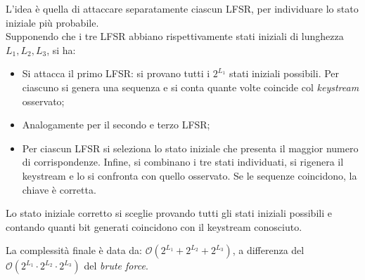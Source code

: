 \noindent L'idea è quella di attaccare separatamente ciascun LFSR, per individuare lo stato iniziale più probabile. \\ Supponendo che i tre LFSR abbiano rispettivamente stati iniziali di lunghezza $L_1, L_2, L_3$, si ha:
\begin{itemize}
    \item Si attacca il primo LFSR: si provano tutti i $2^{L_1}$ stati iniziali possibili. Per ciascuno si genera una sequenza e si conta quante volte coincide col \textit{keystream} osservato;
    \item Analogamente per il secondo e terzo LFSR;
    \item Per ciascun LFSR si seleziona lo stato iniziale che presenta il maggior numero di corrispondenze. Infine, si combinano i tre stati individuati, si rigenera il keystream e lo si confronta con quello osservato. Se le sequenze coincidono, la chiave è corretta.
\end{itemize}  

\noindent Lo stato iniziale corretto si sceglie provando tutti gli stati iniziali possibili e contando quanti bit generati coincidono con il keystream conosciuto. 

\noindent La complessità finale è data da: $\mathcal{O}(2^{L_1}+2^{L_2}+2^{L_3})$, a differenza del $\mathcal{O}(2^{L_1}\cdot 2^{L_2}\cdot 2^{L_3})$ del \textit{brute force}. 